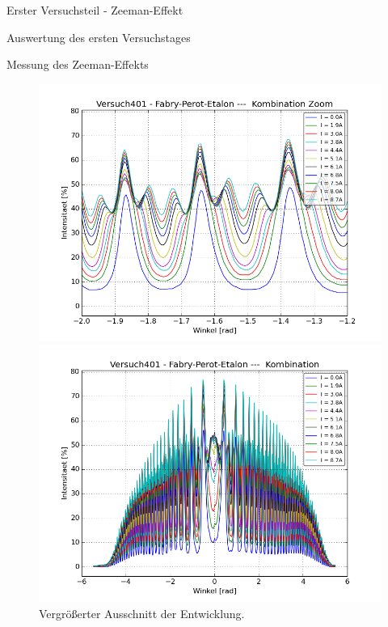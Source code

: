 \documentclass[pdftex, a4paper,11pt, twoside, ngerman]{report}
\begin{document}
\begin{chapter}{Erster Versuchsteil - Zeeman-Effekt}
\begin{section}{Auswertung des ersten Versuchstages}
\begin{subsection}{Messung des Zeeman-Effekts}
        \begin{figure}[ht]
          \centering
          \begin{minipage}{0.48\textwidth}
            \centering
            \includegraphics[width=\textwidth]
                {Figures/Versuch401-Fabry-Perot-Etalon-KombinationZoom_Winkel_Intensitaet.png}
            \caption{Entwicklung der Aufspaltung für verschiedene Stärken des
                Magnetfeldes.}
            \label{fig:FPEcombiZOOM}
          \end{minipage}\quad
          \begin{minipage}{0.48\textwidth}
            \centering
            \includegraphics[width=\textwidth]
                {Figures/Versuch401-Fabry-Perot-Etalon-Kombination_Winkel_Intensitaet.png}
            \caption{Vergrößerter Ausschnitt der Entwicklung.}
            \label{fig:FPEcombi}
          \end{minipage}
        \end{figure}
        

\end{subsection}
\end{section}
\end{chapter}
\end{document}
